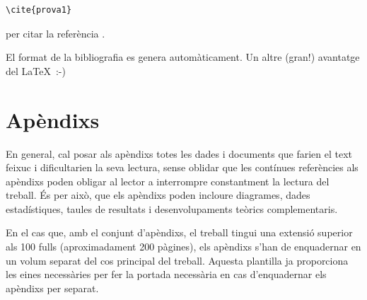 \begin{verbatim}
\cite{prova1}
\end{verbatim}

per citar la referència \cite{prova1}.

El format de la bibliografia es genera automàticament. Un altre (gran!) avantatge del \LaTeX \ :-)


\section{Apèndixs}

En general, cal posar als apèndixs totes les dades i documents que farien el text feixuc i dificultarien la seva lectura, sense oblidar que les contínues referències als apèndixs poden obligar al lector a interrompre constantment la lectura del treball. És per això, que els apèndixs poden incloure diagrames, dades estadístiques, taules de resultats i desenvolupaments teòrics complementaris.

En el cas que, amb el conjunt d'apèndixs, el treball tingui una extensió superior als 100 fulls (aproximadament 200 pàgines), els apèndixs s'han de enquadernar en un volum separat del cos principal del treball. Aquesta plantilla ja proporciona les eines necessàries per fer la portada necessària en cas d'enquadernar els apèndixs per separat.
